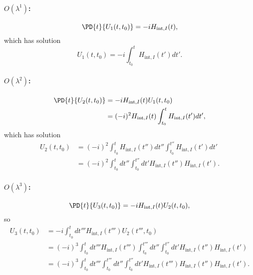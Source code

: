 \paragraph{\(O(\lambda^1)\):}
\begin{equation}\label{eqn:qftLecture13:940}
\PD{t}{U_1(t, t_0)} = -i H_{\text{int}, I}(t),
\end{equation}
which has solution
\begin{equation}\label{eqn:qftLecture13:960}
U_1(t, t_0) = -i \int_{t_0}^t H_{\text{int}, I}(t') dt'.
\end{equation}

\paragraph{\(O(\lambda^2)\):}
\begin{equation}\label{eqn:qftLecture13:1000}
\begin{aligned}
\PD{t}{U_2(t, t_0)}
  &= -i H_{\text{int}, I}(t) U_1(t, t_0)
\\&= (-i)^2 H_{\text{int}, I}(t)
\int_{t_0}^t H_{\text{int}, I}(t') dt',
\end{aligned}
\end{equation}
which has solution
\begin{equation}\label{eqn:qftLecture13:1020}
\begin{aligned}
U_2(t, t_0)
&= (-i )^2
\int_{t_0}^t H_{\text{int}, I}(t'') dt''
\int_{t_0}^{t''} H_{\text{int}, I}(t') dt'
\\&= (-i )^2
\int_{t_0}^t dt''
\int_{t_0}^{t''}
dt'
H_{\text{int}, I}(t'')
H_{\text{int}, I}(t').
\end{aligned}
\end{equation}
\paragraph{\(O(\lambda^3)\):}
\begin{equation}\label{eqn:qftLecture13:1060}
\PD{t}{U_3(t, t_0)} = -i H_{\text{int}, I}(t) U_2(t, t_0),
\end{equation}
so
\begin{equation}\label{eqn:qftLecture13:1240}
\begin{aligned}
U_3(t, t_0)
&=
-i
\int_{t_0}^t dt'''
H_{\text{int}, I}(t''') U_2(t''', t_0)
\\&=
(-i )^3
\int_{t_0}^t dt'''
H_{\text{int}, I}(t''')
\int_{t_0}^{t'''} dt''
\int_{t_0}^{t''}
dt'
H_{\text{int}, I}(t'')
H_{\text{int}, I}(t')
\\&=
(-i)^3
\int_{t_0}^t dt'''
\int_{t_0}^{t'''} dt''
\int_{t_0}^{t''} dt'
H_{\text{int}, I}(t''')
H_{\text{int}, I}(t'')
H_{\text{int}, I}(t').
\end{aligned}
\end{equation}

